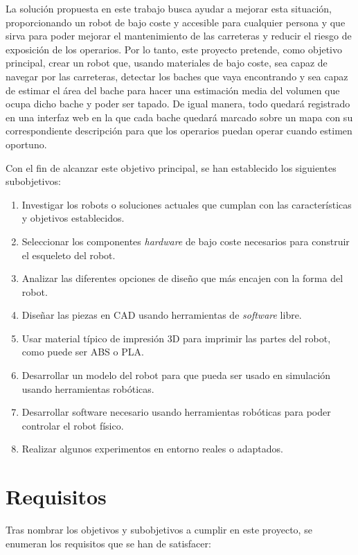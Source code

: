 La solución propuesta en este trabajo busca ayudar a mejorar esta situación, proporcionando un robot de bajo coste y accesible para cualquier persona y que sirva para poder mejorar el mantenimiento de las carreteras y reducir el riesgo de exposición de los operarios. Por lo tanto, este proyecto pretende, como objetivo principal, crear un robot que, usando materiales de bajo coste, sea capaz de navegar por las carreteras, detectar los baches que vaya encontrando y sea capaz de estimar el área del bache para hacer una estimación media del volumen que ocupa dicho bache y poder ser tapado. De igual manera, todo quedará registrado en una interfaz web en la que cada bache quedará marcado sobre un mapa con su correspondiente descripción para que los operarios puedan operar cuando estimen oportuno.

Con el fin de alcanzar este objetivo principal, se han establecido los siguientes subobjetivos:

\begin{enumerate}
	\item{} Investigar los robots o soluciones actuales que cumplan con las características y objetivos establecidos.
	\item{} Seleccionar los componentes \textit{hardware} de bajo coste necesarios para construir el esqueleto del robot.
	\item{} Analizar las diferentes opciones de diseño que más encajen con la forma del robot.
	\item{} Diseñar las piezas en \acs{CAD} usando herramientas de \textit{software} libre.
	\item{} Usar material típico de impresión 3D para imprimir las partes del robot, como puede ser ABS o PLA. 
	\item{} Desarrollar un modelo del robot para que pueda ser usado en simulación usando herramientas robóticas. 
	\item{} Desarrollar software necesario usando herramientas robóticas para poder controlar el robot físico. 
	\item{} Realizar algunos experimentos en entorno reales o adaptados.  
\end{enumerate}
 

\section{Requisitos}
\label{sec:requisitos}

Tras nombrar los objetivos y subobjetivos a cumplir en este proyecto, se enumeran los requisitos que se han de satisfacer: 

